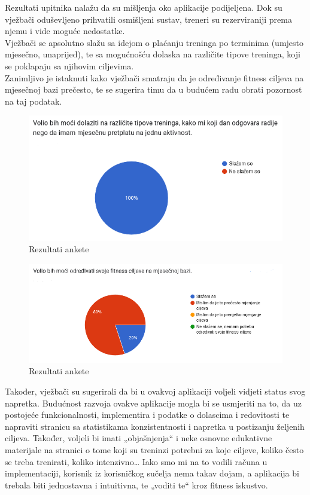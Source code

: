         {Rezultati upitnika nalažu da su mišljenja oko aplikacije podijeljena. Dok su vježbači oduševljeno prihvatili osmišljeni sustav, treneri su rezerviraniji prema njemu i vide moguće nedostatke. \\Vježbači se apsolutno slažu sa idejom o plaćanju treninga po terminima (umjesto mjesečno, unaprijed), te sa mogućnošću dolaska na različite tipove treninga, koji se poklapaju sa njihovim ciljevima. \\Zanimljivo je istaknuti kako vježbači smatraju da je određivanje fitness ciljeva na mjesečnoj bazi prečesto, te se sugerira timu da u budućem radu obrati pozornost na taj podatak. }
                \begin{figure}[H]
                      \includegraphics[scale=0.8]{./Slike/vježbači.png}
                      \centering
                      \caption{Rezultati ankete}
                      \label{fig:promjene}
                \end{figure}
                \begin{figure}[H]
                      \includegraphics[scale=0.7]{./Slike/mjenjanjeciljeva.png}
                      \centering
                      \caption{Rezultati ankete}
                      \label{fig:promjene}
                \end{figure}
        {Također, vježbači su sugerirali da bi u ovakvoj aplikaciji voljeli vidjeti status svog napretka. Budućnost razvoja ovakve aplikacije mogla bi se usmjeriti na to, da uz postojeće funkcionalnosti, implementira i podatke o dolascima i redovitosti te napraviti stranicu sa statistikama konzistentnosti i napretka u postizanju željenih ciljeva. Također, voljeli bi imati „objašnjenja“ i neke osnovne edukativne materijale na stranici o tome koji su treninzi potrebni za koje ciljeve, koliko često se treba trenirati, koliko intenzivno… Iako smo mi na to vodili računa u implementaciji, korisnik iz korisničkog sučelja nema takav dojam, a aplikacija bi trebala biti jednostavna i intuitivna, te „voditi te“ kroz fitness iskustvo. \\}

